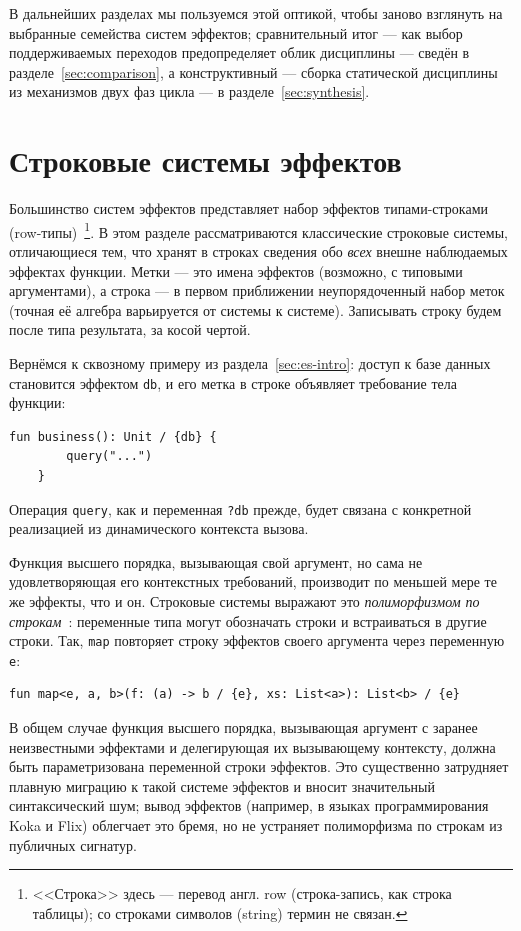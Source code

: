 \documentclass{ProcISPRAS}
\begin{document}
В дальнейших разделах мы пользуемся этой оптикой, чтобы заново взглянуть на
выбранные семейства систем эффектов; сравнительный итог --- как выбор поддерживаемых
переходов предопределяет облик дисциплины --- сведён в разделе~\ref{sec:comparison},
а конструктивный --- сборка статической дисциплины из механизмов двух фаз цикла --- в
разделе~\ref{sec:synthesis}.


\section{Строковые системы эффектов}
\label{sec:rows}

Большинство систем эффектов представляет набор эффектов типами-строками
(row-типы)~\cite{gaster1996polymorphic}\footnote{<<Строка>> здесь --- перевод англ. row
(строка-запись, как строка таблицы); со строками символов (string) термин не связан.}.
В этом разделе рассматриваются классические
строковые системы, отличающиеся тем, что хранят в строках сведения обо \emph{всех}
внешне наблюдаемых эффектах функции. Метки --- это имена эффектов (возможно, с типовыми аргументами),
а строка --- в первом приближении неупорядоченный набор меток (точная её алгебра
варьируется от системы к системе). Записывать строку будем после
типа результата, за косой чертой.

Вернёмся к сквозному примеру из раздела~\ref{sec:es-intro}: доступ к
базе данных становится эффектом \lstinline|db|, и его метка в строке объявляет
требование тела функции:
\begin{lstlisting}[language=colang]
    fun business(): Unit / {db} {
        query("...")
    }
\end{lstlisting}
Операция \lstinline|query|, как и переменная \lstinline|?db| прежде, будет связана
с конкретной реализацией из динамического контекста вызова.

Функция высшего порядка, вызывающая свой аргумент, но сама не удовлетворяющая его
контекстных требований, производит по меньшей мере те же эффекты, что и он.
Строковые системы выражают это \emph{полиморфизмом по строкам}~\cite{gaster1996polymorphic}:
переменные типа могут обозначать строки и встраиваться в другие
строки. Так, \texttt{map} повторяет строку эффектов своего аргумента через переменную
\texttt{e}:
\begin{lstlisting}[language=colang]
    fun map<e, a, b>(f: (a) -> b / {e}, xs: List<a>): List<b> / {e}
\end{lstlisting}
В общем случае функция высшего порядка, вызывающая аргумент с заранее неизвестными
эффектами и делегирующая их вызывающему контексту, должна быть параметризована переменной строки эффектов.
Это существенно затрудняет плавную миграцию к такой системе
эффектов и вносит значительный синтаксический шум; вывод эффектов (например, в языках программирования Koka и
Flix) облегчает это бремя, но не устраняет полиморфизма по строкам из публичных сигнатур.
\end{document}
